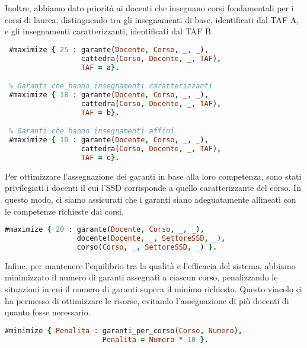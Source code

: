Inoltre, abbiamo dato priorità ai docenti che insegnano corsi fondamentali per i 
corsi di laurea, distinguendo tra gli insegnamenti di base, identificati dal TAF A, 
e gli insegnamenti caratterizzanti, identificati dal TAF B.

\begin{lstlisting}[language=prolog, caption=Gestione delle priorità del TAF.]
 % Garanti che hanno insegnamenti di base
 #maximize { 25 : garante(Docente, Corso, _, _), 
                  cattedra(Corso, Docente, _, TAF), 
                  TAF = a}.

 % Garanti che hanno insegnamenti caratterizzanti
 #maximize { 18 : garante(Docente, Corso, _, _), 
                  cattedra(Corso, Docente, _, TAF), 
                  TAF = b}.

 % Garanti che hanno insegnamenti affini
 #maximize { 10 : garante(Docente, Corso, _, _), 
                  cattedra(Corso, Docente, _, TAF), 
                  TAF = c}.
\end{lstlisting}

Per ottimizzare l'assegnazione dei garanti in base alla loro competenza, sono stati 
privilegiati i docenti il cui l'SSD corrisponde a quello caratterizzante del corso.
In questo modo, ci siamo assicurati che i garanti siano adeguatamente allineati con 
le competenze richieste dai corsi.

\begin{lstlisting}[language=prolog, caption=Preferenza dei garanti con macrosettore coerente a quello del corso.]
% Ottimizzare i garanti con SSD caratterizzante
#maximize { 20 : garante(Docente, Corso, _, _), 
                 docente(Docente, _, SettoreSSD, _), 
                 corso(Corso, _, SettoreSSD, _) }.
\end{lstlisting}

Infine, per mantenere l'equilibrio tra la qualità e l'efficacia del sistema, abbiamo 
minimizzato il numero di garanti assegnati a ciascun corso, penalizzando le situazioni 
in cui il numero di garanti supera il minimo richiesto. Questo vincolo ci ha permesso 
di ottimizzare le risorse, evitando l'assegnazione di più docenti di quanto fosse necessario.

\begin{lstlisting}[language=prolog, caption=Minimizzazione dei garanti per corso di laurea.]
% Minimizzo il numero di garanti per ogni corso
#minimize { Penalita : garanti_per_corso(Corso, Numero),
                       Penalita = Numero * 10 }.
\end{lstlisting}

